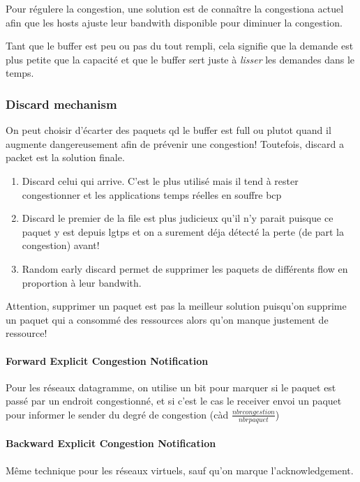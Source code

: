 \documentclass{report}
\begin{document}
Pour régulere la congestion, une solution est de connaître la congestiona actuel afin que
les hosts ajuste leur bandwith disponible pour diminuer la congestion.

Tant que le buffer est peu ou pas du tout rempli, cela signifie que la demande est plus 
petite que la capacité et que le buffer sert juste à \textit{lisser} les demandes dans le temps.


\subsubsection{Discard mechanism}
On peut choisir d'écarter des paquets qd le buffer est full ou plutot quand il 
augmente dangereusement afin de prévenir une congestion!
Toutefois, discard a packet est la solution finale.

\begin{enumerate}
    \item Discard celui qui arrive. C'est le plus utilisé mais il tend à rester congestionner et
        les applications temps réelles en souffre bcp
    \item Discard le premier de la file est plus judicieux qu'il n'y parait puisque ce paquet
        y est depuis lgtps et on a surement déja détecté la perte (de part la congestion) avant!
    \item Random early discard permet de supprimer les paquets de différents flow en proportion
        à leur bandwith.
\end{enumerate}

Attention, supprimer un paquet est pas la meilleur solution puisqu'on supprime un paquet
qui a consommé des ressources alors qu'on manque justement de ressource!

\paragraph{Forward Explicit Congestion Notification}
Pour les réseaux datagramme, 
on utilise un bit pour marquer si le paquet est passé par un endroit congestionné,
et si c'est le cas le receiver envoi un paquet pour informer le sender du degré
de congestion (càd $\frac{nbr congestion}{nbr paquet}$)

\paragraph{Backward Explicit Congestion Notification}
Même technique pour les réseaux virtuels, sauf qu'on marque l'acknowledgement.
\end{document}
